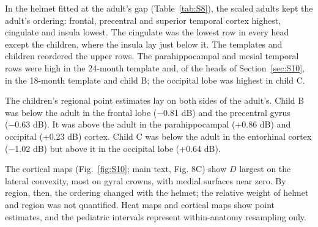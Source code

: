 \documentclass[preprint,12pt,authoryear,a4paper]{elsarticle}
\begin{document}
In the helmet fitted at the adult's gap (Table~\ref{tab:S8}), the scaled adults kept the adult's ordering: frontal, precentral and superior temporal cortex highest, cingulate and insula lowest. The cingulate was the lowest row in every head except the children, where the insula lay just below it. The templates and children reordered the upper rows. The parahippocampal and mesial temporal rows were high in the 24-month template and, of the heads of Section~\ref{sec:S10}, in the 18-month template and child B; the occipital lobe was highest in child C.

The children's regional point estimates lay on both sides of the adult's. Child B was below the adult in the frontal lobe (−0.81 dB) and the precentral gyrus (−0.63 dB). It was above the adult in the parahippocampal (+0.86 dB) and occipital (+0.23 dB) cortex. Child C was below the adult in the entorhinal cortex (−1.02 dB) but above it in the occipital lobe (+0.64 dB).

The cortical maps (Fig.~\ref{fig:S10}; main text, Fig. 8C) show $D$ largest on the lateral convexity, most on gyral crowns, with medial surfaces near zero. By region, then, the ordering changed with the helmet; the relative weight of helmet and region was not quantified. Heat maps and cortical maps show point estimates, and the pediatric intervals represent within-anatomy resampling only.
\end{document}
